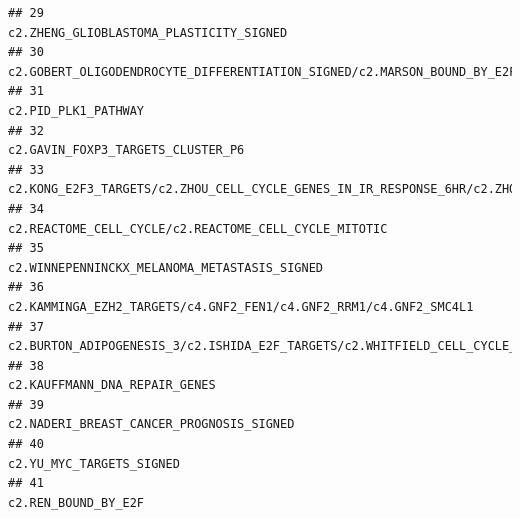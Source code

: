 \documentclass{article}\usepackage[]{graphicx}\usepackage[]{color}
\makeatletter
\newenvironment{kframe}{%
 \def\at@end@of@kframe{}%
 \ifinner\ifhmode%
  \def\at@end@of@kframe{\end{minipage}}%
  \begin{minipage}{\columnwidth}%
 \fi\fi%
 \def\FrameCommand##1{\hskip\@totalleftmargin \hskip-\fboxsep
 \colorbox{shadecolor}{##1}\hskip-\fboxsep
     \hskip-\linewidth \hskip-\@totalleftmargin \hskip\columnwidth}%
 \MakeFramed {\advance\hsize-\width
   \@totalleftmargin\z@ \linewidth\hsize
   \@setminipage}}%
 {\par\unskip\endMakeFramed%
 \at@end@of@kframe}
\newenvironment{knitrout}{}{} %
\makeatother
\begin{document}
\begin{knitrout}
\begin{kframe}
\begin{verbatim}
## 29                                                                                                                                                                           c2.ZHENG_GLIOBLASTOMA_PLASTICITY_SIGNED
## 30                                                                                                                             c2.GOBERT_OLIGODENDROCYTE_DIFFERENTIATION_SIGNED/c2.MARSON_BOUND_BY_E2F4_UNSTIMULATED
## 31                                                                                                                                                                                               c2.PID_PLK1_PATHWAY
## 32                                                                                                                                                                                 c2.GAVIN_FOXP3_TARGETS_CLUSTER_P6
## 33                                                                                                     c2.KONG_E2F3_TARGETS/c2.ZHOU_CELL_CYCLE_GENES_IN_IR_RESPONSE_6HR/c2.ZHOU_CELL_CYCLE_GENES_IN_IR_RESPONSE_24HR
## 34                                                                                                                                                             c2.REACTOME_CELL_CYCLE/c2.REACTOME_CELL_CYCLE_MITOTIC
## 35                                                                                                                                                                      c2.WINNEPENNINCKX_MELANOMA_METASTASIS_SIGNED
## 36                                                                                                                                                 c2.KAMMINGA_EZH2_TARGETS/c4.GNF2_FEN1/c4.GNF2_RRM1/c4.GNF2_SMC4L1
## 37                                                                                                                                 c2.BURTON_ADIPOGENESIS_3/c2.ISHIDA_E2F_TARGETS/c2.WHITFIELD_CELL_CYCLE_LITERATURE
## 38                                                                                                                                                                                     c2.KAUFFMANN_DNA_REPAIR_GENES
## 39                                                                                                                                                                          c2.NADERI_BREAST_CANCER_PROGNOSIS_SIGNED
## 40                                                                                                                                                                                          c2.YU_MYC_TARGETS_SIGNED
## 41                                                                                                                                                                                               c2.REN_BOUND_BY_E2F

\end{verbatim}
\end{kframe}
\end{knitrout}
\end{document}
